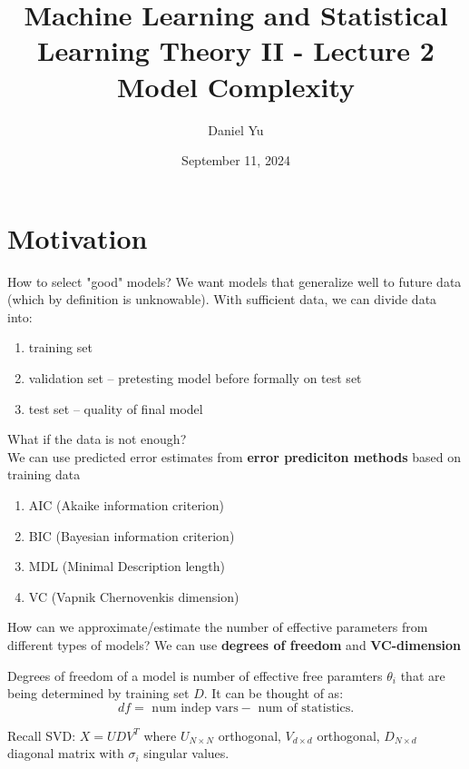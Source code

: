 \documentclass[a4paper]{article}
\title{\Huge{Machine Learning and Statistical Learning Theory II - Lecture 2}\\Model Complexity}
\author{\huge{Daniel Yu}}
\date{September 11, 2024}
\begin{document}
\maketitle
\newpage%
\tableofcontents
\pagebreak

\section{Motivation}
How to select "good" models? We want models that generalize well to future data (which by definition is unknowable). 
With sufficient data, we can divide data into:
\begin{enumerate}
  \item training set
  \item validation set -- pretesting model before formally on test set
  \item test set -- quality of final model
\end{enumerate}
  
What if the data is not enough? \\
We can use predicted error estimates from \textbf{error prediciton methods} based on training data

\begin{enumerate}
  \item AIC (Akaike information criterion)
  \item BIC (Bayesian information criterion)
  \item MDL (Minimal Description length)
  \item VC (Vapnik Chernovenkis dimension)
\end{enumerate}

How can we approximate/estimate the number of effective parameters from different types of models? We can use
\textbf{degrees of freedom} and \textbf{VC-dimension}

\begin{definition}
  Degrees of freedom of a model is number of effective free paramters $\theta_i$ that are being determined by 
  training set $D$. It can be thought of as:
  \[
    df = \text{ num indep vars} - \text{ num of statistics}
  .\] 
\end{definition}

Recall SVD: $X = UDV^T$ where $U_{N \times N}$ orthogonal, $V_{d \times d}$ orthogonal, $D_{N \times d}$ diagonal matrix with
$\sigma_i$ singular values.
\end{document}
